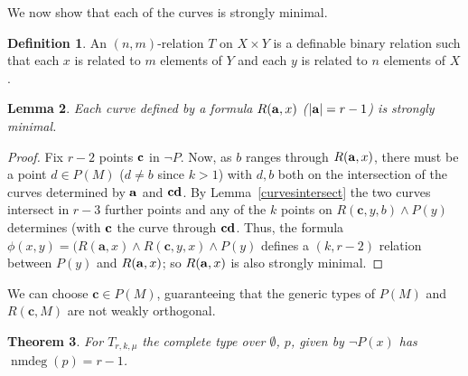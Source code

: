 \documentclass[11pt]{amsart}
\def\abar{{\bf a}}
\def\cbar{\bf c}
\def\nmdeg{\mathop{\rm nmdeg}}
\def\nmdeg{\operatorname{nmdeg}}
\newtheorem{theorem}{Theorem}[section]
\newtheorem{lemma}[theorem]{Lemma}
\theoremstyle{definition}
\newtheorem{definition}[theorem]{Definition}
\theoremstyle{remark}
\numberwithin{equation}{section}
\begin{document}
We now show that each of the curves is strongly minimal.
\begin{definition}
    An  $(n,m)$-relation  $T$ on $X \times Y$ is a definable binary relation such that
    each $x$ is related to $m$ elements of $Y$  and each $y$ is related to $n$ elements of $X$.
\end{definition}




\begin{lemma}\label{smcurves} Each curve defined by a formula $R(\abar,x)$
 ($|\abar| = r-1$) is strongly minimal.

\end{lemma}
\begin{proof}
 Fix $r-2$ points   $\cbar$ in $\neg P$.
Now,
 as $b$ ranges through $R(\abar,x)$, there must be a point $d\in  P(M) $ ($d \neq b$ since $k>1$) with $d,b$ both on the intersection of the curves determined by $\abar$ and $\cbar d$.
 By Lemma~\ref{curvesintersect} the two curves  intersect in $r-3$ further points and any of the $k$ points on $R(\mathbf{c},y,b) \wedge P(y)$ determines (with $\cbar$ the curve through $\cbar d$.
 Thus, the formula
 $\phi(x,y)=(R(\mathbf{a},x) \wedge R(\mathbf{c},y,x) \wedge P(y)$ defines a  $(k,r-2)$ relation between    $P(y)$ and $R(\abar,x)$;
so $R(\abar,x)$ is also strongly minimal.
 \end{proof}

We can choose $\mathbf{c} \in P(M)$, guaranteeing that the generic types of $P(M)$
and $R(\mathbf{c},M)$ are not weakly orthogonal.\


\begin{theorem}\label{2,2} For $T_{r,k,\mu}$ the  complete type over $\emptyset$, $p$,
  given by $\neg P(x)$ has $\nmdeg(p) =r-1$.
 \end{theorem}
\end{document}
